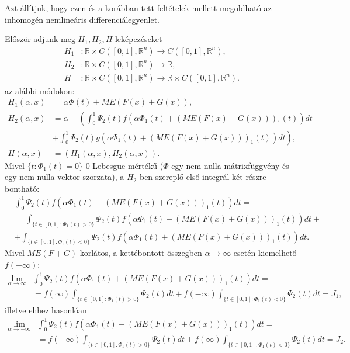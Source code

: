 \documentclass[oneside, titlepage, 12pt, a4paper]{report}
\begin{document}
Azt állítjuk, hogy ezen és a korábban tett feltételek mellett megoldható az inhomogén nemlineáris differenciálegyenlet. \par
Először adjunk meg $H_1, H_2, H$ leképezéseket
\begin{align*}
H_1 &: \mathbb{R} \times C([0, 1], \mathbb{R}^n) \rightarrow C([0, 1], \mathbb{R}^n), \\
H_2 &: \mathbb{R} \times C([0, 1], \mathbb{R}^n) \rightarrow \mathbb{R}, \\
H &: \mathbb{R} \times C([0, 1], \mathbb{R}^n) \rightarrow \mathbb{R} \times C([0, 1], \mathbb{R}^n).
\end{align*}
az alábbi módokon:
\begin{align*}
H_1(\alpha, x) &= \alpha \Phi(t) + ME(F(x) + G(x)), \\
H_2(\alpha, x) &= \alpha - \left( \int_0^1 \Psi_2(t) f(\alpha \Phi_1(t) + (ME(F(x) + G(x)))_1(t)) dt \right. \\
&\left. + \int_0^1 \Psi_2(t) g(\alpha \Phi_1(t) + (ME(F(x) + G(x)))_1(t)) dt \right), \\
H(\alpha, x) &= (H_1(\alpha, x), H_2(\alpha, x)).
\end{align*}
Mivel $\{ t : \Phi_1(t) = 0\}$ $0$ Lebesgue-mértékű ($\Phi$ egy nem nulla mátrixfüggvény és egy nem nulla vektor szorzata), a $H_2$-ben szereplő első integrál két részre bontható:
\begin{align*}
&\int_0^1 \Psi_2(t) f(\alpha \Phi_1(t) + (ME(F(x) + G(x)))_1(t)) dt = \\
&= \int_{ \{ t \in [0, 1] : \Phi_1(t) > 0 \} } \Psi_2(t) f(\alpha \Phi_1(t) + (ME(F(x) + G(x)))_1(t)) dt + \\
&+ \int_{ \{ t \in [0, 1] : \Phi_1(t) < 0 \} } \Psi_2(t) f(\alpha \Phi_1(t) + (ME(F(x) + G(x)))_1(t)) dt.
\end{align*}
Mivel $M E(F + G)$ korlátos, a kettébontott összegben $\alpha \to \infty$ esetén kiemelhető $f(\pm \infty)$:
\begin{align*}
\lim_{\alpha \to \infty} &\int_0^1 \Psi_2(t) f(\alpha \Phi_1(t) + (ME(F(x) + G(x)))_1(t)) dt = \\
&= f(\infty) \int_{ \{ t \in [0, 1] : \Phi_1(t) > 0 \} } \Psi_2(t) dt + f(-\infty) \int_{ \{ t \in [0, 1] : \Phi_1(t) < 0 \} } \Psi_2(t) dt = J_1,
\end{align*}
illetve ehhez hasonlóan
\begin{align*}
\lim_{\alpha \to -\infty} &\int_0^1 \Psi_2(t) f(\alpha \Phi_1(t) + (ME(F(x) + G(x)))_1(t)) dt = \\
&= f(-\infty) \int_{ \{ t \in [0, 1] : \Phi_1(t) > 0 \} } \Psi_2(t) dt + f(\infty) \int_{ \{ t \in [0, 1] : \Phi_1(t) < 0 \} } \Psi_2(t) dt = J_2.
\end{align*}


 

 
\end{document}
